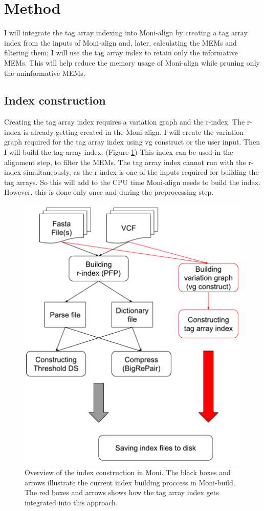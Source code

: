 \documentclass[11pt]{ucthesis}
\begin{document}
\section{Method}
I will integrate the tag array indexing into Moni-align by creating a tag array index from the inputs of Moni-align and, later, calculating the MEMs and filtering them; I will use the tag array index to retain only the informative MEMs. This will help reduce the memory usage of Moni-align while pruning only the uninformative MEMs. \\
\subsection{Index construction}
Creating the tag array index requires a variation graph and the r-index. The r-index is already getting created in the Moni-align. I will create the variation graph required for the tag array index using vg construct \cite{garrison2018variation} or the user input. Then I will build the tag array index. (Figure \ref{fig:3:1}) This index can be used in the alignment step, to filter the MEMs. The tag array index cannot run with the r-index simultaneously, as the r-index is one of the inputs required for building the tag arrays. So this will add to the CPU time Moni-align needs to build the index. However, this is done only once and during the preprocessing step. 
\begin{figure}[h]
    \centering
    \includegraphics[width=0.6\linewidth]{Images/moni-build.pdf}
    \caption[Index construction in Moni-align with tag arrays]{Overview of the index construction in Moni. The black boxes and arrows illustrate the current index building proccess in Moni-build. The red boxes and arrows shows how the tag array index gets integrated into this approach.}
    \label{fig:3:1}
\end{figure}
\end{document}
